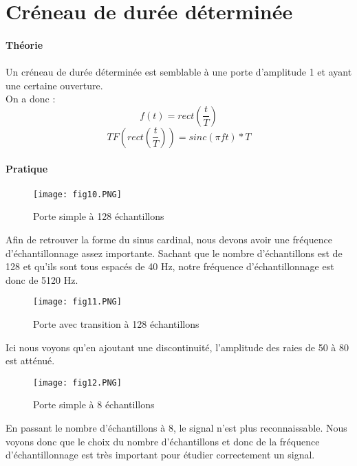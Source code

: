 \documentclass[oneside,a4paper,12pt]{article}
\begin{document}
	\section{Créneau de durée déterminée}

	\paragraph{Théorie}\paragraph{}
	
	Un créneau de durée déterminée est semblable à une porte d’amplitude 1 et ayant une certaine ouverture.\\
	On a donc :
	$$ f(t) = rect(\frac{t}{T}) $$
	$$ TF(rect(\frac{t}{T})) = sinc(\pi f t)*T $$

	\paragraph{Pratique}\paragraph{}
	
	\begin{figure}[h]
		\centering
		\texttt{[image: fig10.PNG]}
		\caption{Porte simple à 128 échantillons}
	\end{figure}
	Afin de retrouver la forme du sinus cardinal, nous devons avoir une fréquence d'échantillonnage assez importante. Sachant que le nombre d’échantillons est de 128 et qu’ils sont tous espacés de 40 Hz, notre fréquence d’échantillonnage est donc de  5120 Hz.
	\newpage
	
	\begin{figure}[h]
		\centering
		\texttt{[image: fig11.PNG]}
		\caption{Porte avec transition à 128 échantillons}
	\end{figure}
	Ici nous voyons qu’en ajoutant une discontinuité, l’amplitude des raies de 50 à 80 est atténué.
	
	\begin{figure}[h]
		\centering
		\texttt{[image: fig12.PNG]}
		\caption{Porte simple à 8 échantillons}
	\end{figure}
	En passant le nombre d’échantillons à 8, le signal n’est plus reconnaissable. Nous voyons donc que le choix du nombre d’échantillons et donc de la fréquence d'échantillonnage est très important pour étudier correctement un signal.
\end{document}
